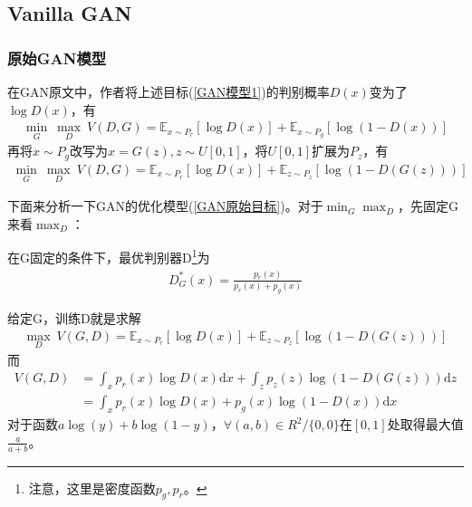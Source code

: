     \subsection{Vanilla GAN}
        \subsubsection{原始GAN模型}
            \par
            在GAN原文\cite{2014.Goodfellow}中，作者将上述目标(\ref{GAN模型1})的判别概率$D(x)$变为了$\log D(x)$，有
            \begin{align*}
            \min_G\ \max_D\ V(D,G) =  \mathbb{E}_{x\sim P_r}[\log D(x)]+\mathbb{E}_{x\sim P_g}[\log(1-D(x))]
            \end{align*}
            再将$x\sim P_g$改写为$x = G(z),z\sim U[0,1]$，将$U[0,1]$扩展为$P_z$，有
            \begin{align}
            \label{GAN原始目标}
            \min_G\ \max_D\ V(D,G) =  \mathbb{E}_{x\sim P_r}[\log D(x)]+\mathbb{E}_{z\sim P_z}[\log(1-D(G(z)))]
            \end{align}
            \par
            下面来分析一下GAN的优化模型(\ref{GAN原始目标})。对于$\min_G\max_D$，先固定G来看$\max_D$：
            \begin{theorem}[最优判别器D]
            在G固定的条件下，最优判别器D\footnote{注意，这里是密度函数$p_g,p_r$。}为
            \begin{align*}
            D_G^*(x) = \frac{p_r(x)}{p_r(x)+p_g(x)}
            \end{align*}
            \end{theorem}
            \begin{Proof}
            给定G，训练D就是求解
            \begin{align*}
            \max_D \ V(G,D) = \mathbb{E}_{x\sim P_r}[\log D(x)]+\mathbb{E}_{z\sim P_z}[\log(1-D(G(z)))]
            \end{align*}
            而
            \begin{align*}
            V(G,D) &= \int_x p_r(x) \log D(x)\mathrm{d}x + \int_z p_z(z)\log(1-D(G(z)))\mathrm{d}z\\
            &=\int_x p_r(x)\log D(x)+ p_g(x)\log(1-D(x))\mathrm{d}x
            \end{align*}
            对于函数$a\log(y)+b\log(1-y)$，$\forall (a,b)\in R^2/\{0,0\}$在$[0,1]$处取得最大值$\frac{a}{a+b}$。
            \end{Proof}
